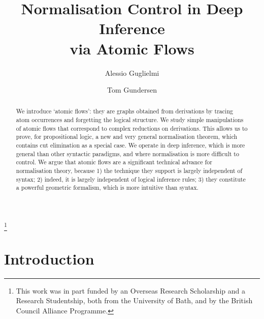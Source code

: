 \documentclass[a4paper]{LMCS}
\newif\iflmcs\lmcstrue
\begin{document}
\title[Normalisation Control in Deep Inference   via Atomic Flows]
      {Normalisation Control in Deep Inference\\ via Atomic
      Flows\rsuper *}

\author{Alessio Guglielmi}
\address{University of Bath, Bath BA2 7AY, UK}
\iflmcs{}\fi

\author{Tom Gundersen}

\thanks{This work was in part funded by an Overseas Research Scholarship and a Research Studentship, both from the University of Bath, and by the British Council Alliance Programme.}



\begin{abstract}
We introduce `atomic flows': they are graphs obtained from derivations by tracing atom occurrences and forgetting the logical structure. We study simple manipulations of atomic flows that correspond to complex reductions on derivations. This allows us to prove, for propositional logic, a new and very general normalisation theorem, which contains cut elimination as a special case. We operate in deep inference, which is more general than other syntactic paradigms, and where normalisation is more difficult to control. We argue that atomic flows are a significant technical advance for normalisation theory, because 1) the technique they support is largely independent of syntax; 2) indeed, it is largely independent of logical inference rules; 3) they constitute a powerful geometric formalism, which is more intuitive than syntax.
\end{abstract}

\maketitle

\section{Introduction}
\end{document}
